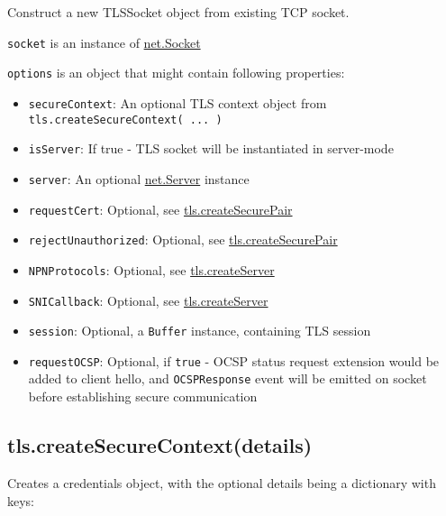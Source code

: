 Construct a new TLSSocket object from existing TCP socket.

\texttt{socket} is an instance of
\href{net.html\#net_class_net_socket}{net.Socket}

\texttt{options} is an object that might contain following properties:

\begin{itemize}
\item
  \texttt{secureContext}: An optional TLS context object from
  \texttt{tls.createSecureContext(\ ...\ )}
\item
  \texttt{isServer}: If true - TLS socket will be instantiated in
  server-mode
\item
  \texttt{server}: An optional
  \href{net.html\#net_class_net_server}{net.Server} instance
\item
  \texttt{requestCert}: Optional, see
  \hyperref[tlsux5ftlsux5fcreatesecurepairux5fcredentialsux5fisserverux5frequestcertux5frejectunauthorized]{tls.createSecurePair}
\item
  \texttt{rejectUnauthorized}: Optional, see
  \hyperref[tlsux5ftlsux5fcreatesecurepairux5fcredentialsux5fisserverux5frequestcertux5frejectunauthorized]{tls.createSecurePair}
\item
  \texttt{NPNProtocols}: Optional, see
  \hyperref[tlsux5ftlsux5fcreateserverux5foptionsux5fsecureconnectionlistener]{tls.createServer}
\item
  \texttt{SNICallback}: Optional, see
  \hyperref[tlsux5ftlsux5fcreateserverux5foptionsux5fsecureconnectionlistener]{tls.createServer}
\item
  \texttt{session}: Optional, a \texttt{Buffer} instance, containing TLS
  session
\item
  \texttt{requestOCSP}: Optional, if \texttt{true} - OCSP status request
  extension would be added to client hello, and \texttt{OCSPResponse}
  event will be emitted on socket before establishing secure
  communication
\end{itemize}

\subsection{tls.createSecureContext(details)}\label{tls.createsecurecontextdetails}

Creates a credentials object, with the optional details being a
dictionary with keys:

